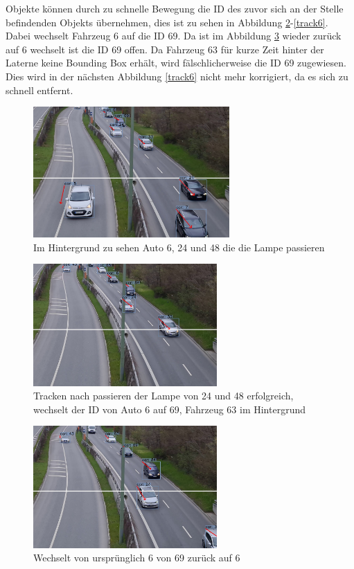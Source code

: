 \documentclass[conference]{IEEEtran}
\begin{document}
	Objekte können durch zu schnelle Bewegung die ID des zuvor sich an der Stelle
	befindenden Objekts übernehmen, dies ist zu sehen in Abbildung \ref{track4}-\ref{track6}.
	Dabei wechselt Fahrzeug 6 auf die ID 69. Da ist im Abbildung \ref{track5} wieder zurück auf 6
	wechselt ist die ID 69 offen. Da Fahrzeug 63 für kurze Zeit hinter der Laterne keine Bounding Box erhält, wird fälschlicherweise die ID 69 zugewiesen.
	Dies wird in der nächsten Abbildung \ref{track6} nicht mehr korrigiert, da es sich zu schnell entfernt.\\
	\begin{figure}[!h]
		\begin{center}
			\includegraphics[width=7.5cm]{Media/switch1.jpg}
			\caption{Im Hintergrund zu sehen Auto 6, 24 und 48 die die Lampe passieren}
			\label{track3}
		\end{center}
	\end{figure}
	\begin{figure}[!h]
		\begin{center}
			\includegraphics[width=7cm]{Media/switch2.jpg}
			\caption{Tracken nach passieren der Lampe von 24 und 48 erfolgreich, wechselt der ID von Auto 6 auf 69, Fahrzeug 63 im Hintergrund}
			\label{track4}
		\end{center}
	\end{figure}
	\begin{figure}[!h]
		\begin{center}
			\includegraphics[width=7cm]{Media/switch3.jpg}
			\caption{Wechselt von ursprünglich 6 von 69 zurück auf 6 }
			\label{track5}
		\end{center}
	\end{figure}
\end{document}
